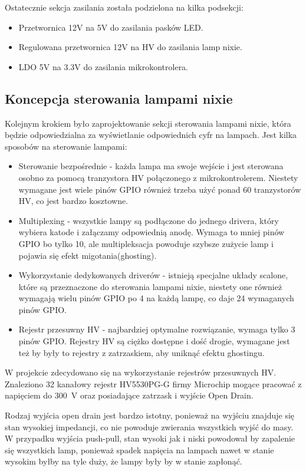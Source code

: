 \documentclass{article}
\begin{document}
Ostatecznie sekcja zasilania została podzielona na kilka podsekcji:
\begin{itemize}
    \item Przetwornica 12V na 5V do zasilania pasków LED.
    \item Regulowana przetwornica 12V na HV do zasilania lamp nixie.
    \item LDO 5V na 3.3V do zasilania mikrokontrolera.
\end{itemize}

\subsection{Koncepcja sterowania lampami nixie}
Kolejnym krokiem było zaprojektowanie sekcji sterowania lampami nixie, która będzie odpowiedzialna za wyświetlanie odpowiednich cyfr na lampach.
Jest kilka sposobów na sterowanie lampami:

\begin{itemize}
    \item Sterowanie bezpośrednie - każda lampa ma swoje wejście i jest sterowana osobno za pomocą tranzystora HV połączonego z mikrokontrolerem.
    Niestety wymagane jest wiele pinów GPIO również trzeba użyć ponad 60 tranzystorów HV, co jest bardzo kosztowne.
    \item Multiplexing - wszystkie lampy są podłączone do jednego drivera, który wybiera katode i załączamy odpowiednią anodę. 
    Wymaga to mniej pinów GPIO bo tylko 10, ale multipleksacja powoduje szybsze zużycie lamp i pojawia się efekt migotania(ghosting).
    \item Wykorzystanie dedykowanych driverów - istnieją specjalne układy scalone, które są przeznaczone do sterowania lampami nixie, niestety
    one również wymagają wielu pinów GPIO po 4 na każdą lampę, co daje 24 wymaganych pinów GPIO.
    \item Rejestr przesuwny HV - najbardziej optymalne rozwiązanie, wymaga tylko 3 pinów GPIO. Rejestry HV są ciężko dostępne i dość drogie,
    wymagane jest też by były to rejestry z zatrzaskiem, aby uniknąć efektu ghostingu.
\end{itemize}

W projekcie zdecydowano się na wykorzystanie rejestrów przesuwnych HV. Znaleziono 32 kanałowy rejestr 
HV5530PG-G firmy Microchip mogące pracować z napięciem do \SI{300}{\volt} oraz posiadające zatrzask i wyjście Open Drain.

Rodzaj wyjścia open drain jest bardzo istotny, ponieważ na wyjściu znajduje się stan wysokiej impedancji, co nie powoduje zwierania wszystkich wyjść do masy.
W przypadku wyjścia push-pull, stan wysoki jak i niski powodował by zapalenie się wszystkich lamp, ponieważ spadek napięcia na lampach
nawet w stanie wysokim byłby na tyle duży, że lampy były by w stanie zapłonąć.
\end{document}
